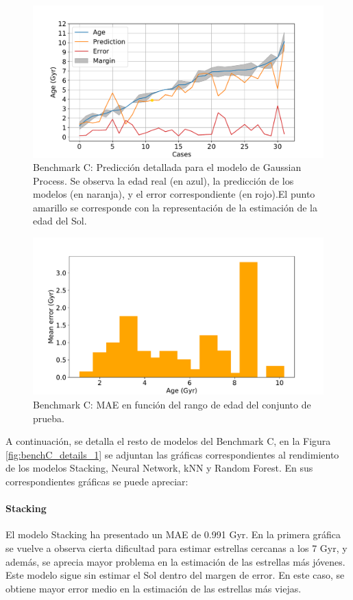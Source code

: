 \begin{figure}[H]
\begin{center}
 \includegraphics[width=0.8\linewidth]{Figuras/Experimentos/B_C_gp_2.pdf}
\end{center}
\caption{Benchmark C: Predicción detallada para el modelo de Gaussian Process. Se observa la edad real (en azul), la predicción de los modelos (en naranja), y el error correspondiente (en rojo).El punto amarillo se corresponde con la representación de la estimación de la edad del Sol.}
 \label{fig:benchC_best_2}
\end{figure}

\begin{figure}[H]
\begin{center}
 \includegraphics[width=0.8\linewidth]{Figuras/Experimentos/B_C_gp_3.pdf}
\end{center}
\caption{Benchmark C: MAE en función del rango de edad del conjunto de prueba.}
 \label{fig:benchC_best_3}
\end{figure}

A continuación, se detalla el resto de modelos del Benchmark C, en la Figura \ref{fig:benchC_details_1} se adjuntan las gráficas correspondientes al rendimiento de los modelos Stacking, Neural Network, kNN y Random Forest. En sus correspondientes gráficas se puede apreciar:

\paragraph{Stacking} 
El modelo Stacking ha presentado un MAE de 0.991 Gyr. En la primera gráfica se vuelve a observa cierta dificultad para estimar estrellas cercanas a los 7 Gyr, y además, se aprecia mayor problema en la estimación de las estrellas más jóvenes. Este modelo sigue sin estimar el Sol dentro del margen de error. En este caso, se obtiene mayor error medio en la estimación de las estrellas más viejas.

